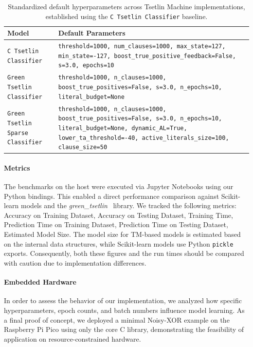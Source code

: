 \documentclass[english]{aghengthesis} %
\newcommand*{\GreenTsetlinName}{\emph{green\_tsetlin}~\cite{glimsdal2024greentsetlin} }
\begin{document}
\begin{table}[!htbp]
\centering
\caption[Tsetlin Machine Default Parameters]{Standardized default hyperparameters across Tsetlin Machine implementations, established using the \texttt{C Tsetlin Classifier} baseline.}
\begin{tabularx}{\columnwidth}{@{}l L@{}} \toprule
    \textbf{Model} & \textbf{Default Parameters} \\ \midrule \midrule
    \texttt{C Tsetlin Classifier} & \texttt{threshold=1000, num\_clauses=1000, max\_state=127, min\_state=-127, boost\_true\_positive\_feedback=False, s=3.0, epochs=10} \\ \midrule
    \texttt{Green Tsetlin Classifier} & \texttt{threshold=1000, n\_clauses=1000, boost\_true\_positives=False, s=3.0, n\_epochs=10, literal\_budget=None} \\ \midrule
    \texttt{Green Tsetlin Sparse Classifier} & \texttt{threshold=1000, n\_clauses=1000, boost\_true\_positives=False, s=3.0, n\_epochs=10, literal\_budget=None, dynamic\_AL=True, lower\_ta\_threshold=-40, active\_literals\_size=100, clause\_size=50} \\ \bottomrule
\end{tabularx}
\label{tab:tm-default-params}
\end{table}

\paragraph{Metrics}
The benchmarks on the host were executed via Jupyter Notebooks using our Python bindings. This enabled a direct performance comparison against Scikit-learn models and the \GreenTsetlinName library. We tracked the following metrics: Accuracy on Training Dataset, Accuracy on Testing Dataset, Training Time, Prediction Time on Training Dataset, Prediction Time on Testing Dataset, Estimated Model Size. The model size for TM-based models is estimated based on the internal data structures, while Scikit-learn models use Python \texttt{pickle} exports. Consequently, both these figures and the run times should be compared with caution due to implementation differences.

\paragraph{Embedded Hardware}
In order to assess the behavior of our implementation, we analyzed how specific hyperparameters, epoch counts, and batch numbers influence model learning. As a final proof of concept, we deployed a minimal Noisy-XOR example on the Raspberry Pi Pico using only the core C library, demonstrating the feasibility of application on resource-constrained hardware.
\end{document}
